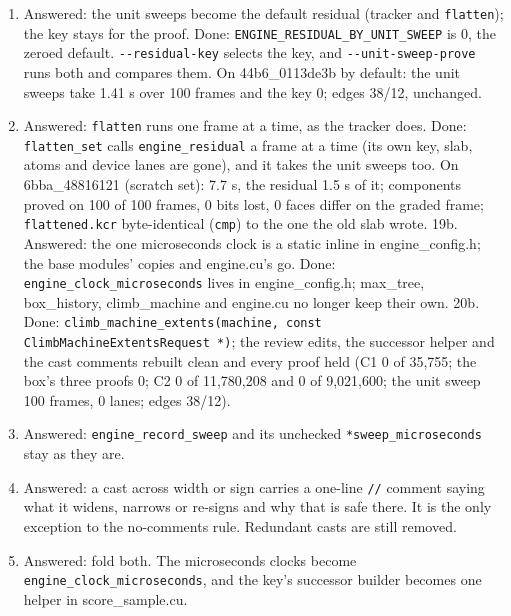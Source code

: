 \begin{enumerate}
\item Answered: the unit sweeps become the default residual (tracker and \texttt{flatten}); the key stays for the proof. Done: \texttt{ENGINE\_\allowbreak{}RESIDUAL\_\allowbreak{}BY\_\allowbreak{}UNIT\_\allowbreak{}SWEEP} is 0, the zeroed default. \texttt{-\allowbreak{}-\allowbreak{}residual-\allowbreak{}key} selects the key, and \texttt{-\allowbreak{}-\allowbreak{}unit-\allowbreak{}sweep-\allowbreak{}prove} runs both and compares them. On 44b6\_\allowbreak{}0113de3b by default: the unit sweeps take 1.41 s over 100 frames and the key 0; edges 38/12, unchanged.
\item Answered: \texttt{flatten} runs one frame at a time, as the tracker does. Done: \texttt{flatten\_\allowbreak{}set} calls \texttt{engine\_\allowbreak{}residual} a frame at a time (its own key, slab, atoms and device lanes are gone), and it takes the unit sweeps too. On 6bba\_\allowbreak{}48816121 (scratch set): 7.7 s, the residual 1.5 s of it; components proved on 100 of 100 frames, 0 bits lost, 0 faces differ on the graded frame; \texttt{flattened.\allowbreak{}kcr} byte-identical (\texttt{cmp}) to the one the old slab wrote. 19b. Answered: the one microseconds clock is a static inline in engine\_\allowbreak{}config.h; the base modules' copies and engine.cu's go. Done: \texttt{engine\_\allowbreak{}clock\_\allowbreak{}microseconds} lives in engine\_\allowbreak{}config.h; max\_\allowbreak{}tree, box\_\allowbreak{}history, climb\_\allowbreak{}machine and engine.cu no longer keep their own. 20b. Done: \texttt{climb\_\allowbreak{}machine\_\allowbreak{}extents(machine, const Climb\allowbreak{}Machine\allowbreak{}Extents\allowbreak{}Request *)}; the review edits, the successor helper and the cast comments rebuilt clean and every proof held (C1 0 of 35,755; the box's three proofs 0; C2 0 of 11,780,208 and 0 of 9,021,600; the unit sweep 100 frames, 0 lanes; edges 38/12).
\item Answered: \texttt{engine\_\allowbreak{}record\_\allowbreak{}sweep} and its unchecked \texttt{*sweep\_\allowbreak{}microseconds} stay as they are.
\item Answered: a cast across width or sign carries a one-line \texttt{/\allowbreak{}/\allowbreak{}} comment saying what it widens, narrows or re-signs and why that is safe there. It is the only exception to the no-comments rule. Redundant casts are still removed.
\item Answered: fold both. The microseconds clocks become \texttt{engine\_\allowbreak{}clock\_\allowbreak{}microseconds}, and the key's successor builder becomes one helper in score\_\allowbreak{}sample.cu.

\end{enumerate}
